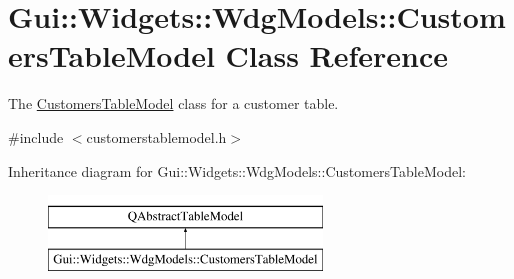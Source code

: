 \hypertarget{classGui_1_1Widgets_1_1WdgModels_1_1CustomersTableModel}{\section{Gui\-:\-:Widgets\-:\-:Wdg\-Models\-:\-:Customers\-Table\-Model Class Reference}
\label{classGui_1_1Widgets_1_1WdgModels_1_1CustomersTableModel}
}


The \hyperlink{classGui_1_1Widgets_1_1WdgModels_1_1CustomersTableModel}{Customers\-Table\-Model} class for a customer table.  




{\ttfamily \#include $<$customerstablemodel.\-h$>$}

Inheritance diagram for Gui\-:\-:Widgets\-:\-:Wdg\-Models\-:\-:Customers\-Table\-Model\-:\begin{figure}[H]
\begin{center}
\leavevmode
\includegraphics[height=2.000000cm]{d7/d12/classGui_1_1Widgets_1_1WdgModels_1_1CustomersTableModel}
\end{center}
\end{figure}
